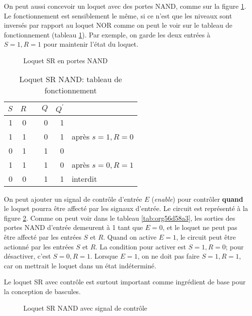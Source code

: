 \documentclass[11pt]{article}
\begin{document}
On peut aussi concevoir un loquet avec des portes NAND, comme sur la
figure \ref{fig:org8721090}. Le fonctionnement est sensiblement le même,
si ce n'est que les niveaux sont inversés par rapport au loquet NOR
comme on peut le voir sur le tableau de fonctionnement (tableau
\ref{tab:orge640636}). Par exemple, on garde les deux entrées à \(S=1, R=1\)
pour maintenir l'état du loquet.

\begin{figure}[htbp]
\centering

\caption{\label{fig:org8721090}Loquet SR en portes NAND}
\end{figure}

\begin{table}[htbp]
\caption{\label{tab:orge640636}Loquet SR NAND: tableau de fonctionnement}
\centering
\begin{tabular}{rrlrrl}
\(S\) & \(R\) &  & \(Q\) & \(Q^\prime\) & \\
\hline
1 & 0 &  & 0 & 1 & \\
1 & 1 &  & 0 & 1 & après \(s=1, R=0\)\\
0 & 1 &  & 1 & 0 & \\
1 & 1 &  & 1 & 0 & après \(s=0, R=1\)\\
0 & 0 &  & 1 & 1 & interdit\\
\end{tabular}
\end{table}

On peut ajouter un signal de contrôle d'entrée \(E\) (\emph{enable}) pour
contrôler \textbf{quand} le loquet pourra être affecté par les signaux
d'entrée. Le circuit est représenté à la figure \ref{fig:org8d11330}. Comme
on peut voir dans le tableau \ref{tab:org56d58a3}, les sorties des portes
NAND d'entrée demeurent à 1 tant que \(E = 0\), et le loquet ne peut
pas être affecté par les entrées \(S\) et \(R\). Quand on active \(E
= 1\), le circuit peut être actionné par les entrées \(S\) et \(R\). La condition pour activer est \(S=1, R=0\); pour désactiver,
c'est \(S=0, R=1\). Lorsque \(E = 1\), on ne doit pas faire \(S=1,
R=1\), car on mettrait le loquet dans un état indéterminé.

Le loquet SR avec contrôle est surtout important comme
ingrédient de base pour la conception de bascules.

\begin{figure}[htbp]
\centering

\caption{\label{fig:org8d11330}Loquet SR NAND avec signal de contrôle}
\end{figure}
\end{document}
